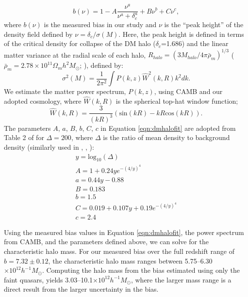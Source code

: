 \documentclass[apj, numberedappendix]{emulateapj}
\begin{document}
\begin{equation}\label{eqn:dmhalofit}
b(\nu) = 1 - A\frac{\nu^a}{\nu^a + \delta_c^a} + B\nu^b+C\nu^c,
\end{equation}
where $b(\nu)$ is the measured bias in our study and $\nu$ is the ``peak height'' of the density field defined by $\nu = \delta_c/\sigma(M)$. Here, the peak height is defined in terms of the critical density for collapse of the DM halo ($\delta_c$=1.686) and the linear matter variance at the radial scale of each halo, $R_{halo} = (3M_{halo}/4\pi\bar{\rho}_m)^{1/3}$ ($\bar{\rho}_m=2.78\times 10^{11}\Omega_mh^2M_{\odot}$; \citealt{He2017}), defined by:
\begin{equation}
\sigma^2(M) = \frac{1}{2\pi^2}\int P(k,z)\hat{W}^2(k,R)k^2dk.
\end{equation}
We estimate the matter power spectrum, $P(k,z)$, using CAMB and our adopted cosmology, where $\hat{W}(k,R)$ is the spherical top-hat window function;
\begin{equation}
\hat{W}(k,R) = \frac{3}{(kR)^3}\left(\mathrm{sin}(kR)-kR\mathrm{cos}(kR)\right).
\end{equation}
The parameters $A$, $a$, $B$, $b$, $C$, $c$  in Equation \eqref{eqn:dmhalofit} are adopted from Table 2 of \citet{Tinker2010} for $\Delta = 200$, where $\Delta$ is the ratio of mean density to background density (similarly used in \citealt{Eft2015}, \citealt{DiPompeo2016}, \citealt{He2017}):
\begin{gather}
y = \mathrm{log}_{10}(\Delta) \nonumber \\
A = 1+0.24ye^{-(4/y)^4} \nonumber \\
a = 0.44y-0.88 \nonumber\\
B = 0.183 \\ 
b = 1.5 \nonumber\\
C = 0.019+0.107y+0.19e^{-(4/y)^4} \nonumber\\
c = 2.4 \nonumber
\label{eqn:params}
\end{gather}

Using the measured bias values in Equation \ref{eqn:dmhalofit}, the power spectrum from CAMB, and the parameters defined above, we can solve for the characteristic halo mass. For our measured bias over the full redshift range of $b = 7.32 \pm 0.12$, the characteristic halo mass ranges between 5.75--6.30$\times 10^{12} h^{-1}M_{\odot}$. Computing the halo mass from the bias estimated using only the faint quasars, yields 3.03--10.1$\times 10^{12} h^{-1}M_{\odot}$, where the larger mass range is a direct result from the larger uncertainty in the bias.
\end{document}
